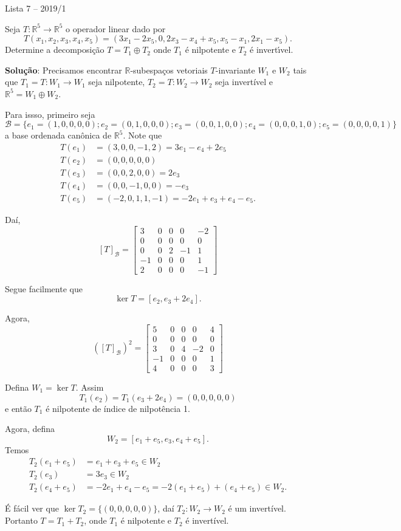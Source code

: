 \documentclass[12pt]{article}
\newcounter{exercicios}
\newcommand{\questao}{
\addtocounter{exercicios}{27}
\noindent{\bf Exerc{\'\i}cio \arabic{exercicios}: }}
\newcommand{\real}{\mathbb{R}}
\begin{document}
\begin{center}
    Lista 7 -- 2019/1
\end{center}
\questao Seja $T : \real^5 \to \real^5$ o operador linear dado por
  \[
      T(x_1,x_2,x_3,x_4,x_5) = (3x_1 -2x_5, 0 , 2x_3 - x_4 + x_5, x_5 - x_1, 2x_1 - x_5).
  \]
  Determine a decomposi\c{c}\~ao $T = T_1 \oplus T_2$ onde $T_1$ \'e nilpotente e $T_2$ \'e invert{\'\i}vel.

\textbf{Solu{\c c}{\~a}o}: Precisamos encontrar $\real$-subespaços vetoriais $T$-invariante $W_1$ e $W_2$ tais que $T_1 = T : W_1 \to W_1$ seja nilpotente, $T_2 = T : W_2 \to W_2$ seja invertível e $\real^5 = W_1 \oplus W_2$.

Para issso, primeiro seja
\[
    \mathcal{B} = \{e_1 = (1,0,0,0,0); e_2 = (0,1,0,0,0); e_3 = (0,0,1,0,0); e_4 = (0,0,0,1,0); e_5 = (0,0,0,0,1)\}
\]
a base ordenada canônica de $\real^5$. Note que
\begin{align*}
	T(e_1) &= (3,0,0,-1,2) = 3e_1 - e_4 + 2e_5\\
	T(e_2) &= (0,0,0,0,0)\\
	T(e_3) &= (0,0,2,0,0) = 2e_3\\
	T(e_4) &= (0,0,-1,0,0) = -e_3\\
	T(e_5) &= (-2,0,1,1,-1) = -2e_1 + e_3 + e_4 - e_5.
\end{align*}

Daí,
\[
    [T]_\mathcal{B} = \begin{bmatrix}
        3 & 0 & 0 & 0 & -2\\
        0 & 0 & 0 & 0 & 0\\
        0 & 0 & 2 & -1 & 1\\
        -1 & 0 & 0 & 0 & 1\\
        2 & 0 & 0 & 0 & -1
    \end{bmatrix}
\]

Segue facilmente que
\[
 	\ker T = [e_2, e_3 + 2e_4].
\]

Agora,
\[
    ([T]_\mathcal{B})^2 = \begin{bmatrix}
        5 & 0 & 0 & 0 & 4\\
        0 & 0 & 0 & 0 & 0\\
        3 & 0 & 4 & -2 & 0\\
        -1 & 0 & 0 & 0 & 1\\
        4 & 0 & 0 & 0 & 3
    \end{bmatrix}
\]

Defina $W_1 = \ker T$. Assim
\[
	T_1(e_2) = T_1(e_3 + 2e_4) = (0,0,0,0,0)
\]
e então $T_1$ é nilpotente de índice de nilpotência 1.

Agora, defina
\[
	W_2 = [e_1 + e_5, e_3, e_4 + e_5].
\]
Temos
\begin{align*}
	T_2(e_1 + e_5) &= e_1 + e_3 + e_5 \in W_2\\
	T_2(e_3) &= 3e_3 \in W_2\\
	T_2(e_4 + e_5) &= -2e_1 + e_4 - e_5 = -2(e_1 + e_5) + (e_4 + e_5) \in W_2.
\end{align*}

É fácil ver que $\ker T_2 = \{(0,0,0,0,0)\}$, daí $T_2 : W_2 \to W_2$ é um invertível. Portanto $T = T_1 + T_2$, onde $T_1$ é nilpotente e $T_2$ é invertível.
\end{document}
